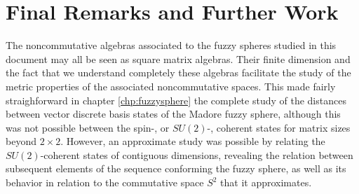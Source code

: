 \documentclass[12pt]{report}
\theoremstyle{definition}
\begin{document}
\chapter{Final Remarks and Further Work}
 \label{chp:remarks}

The noncommutative algebras associated to the fuzzy spheres studied in this document may all be seen as square matrix algebras. Their finite dimension and the fact that we understand completely these algebras facilitate the study of the metric properties of the associated noncommutative spaces. This made fairly straighforward in chapter \ref{chp:fuzzysphere} the complete study of the distances between vector discrete basis states of the Madore fuzzy sphere, although this was not possible between the spin-, or $SU(2)$-, coherent states for matrix sizes beyond $2 \times 2$. However, an approximate study was possible by relating the $SU(2)$-coherent states of contiguous dimensions, revealing the relation between subsequent elements of the sequence conforming the fuzzy sphere, as well as its behavior in relation to the commutative space $S^2$ that it approximates. 
\end{document}
